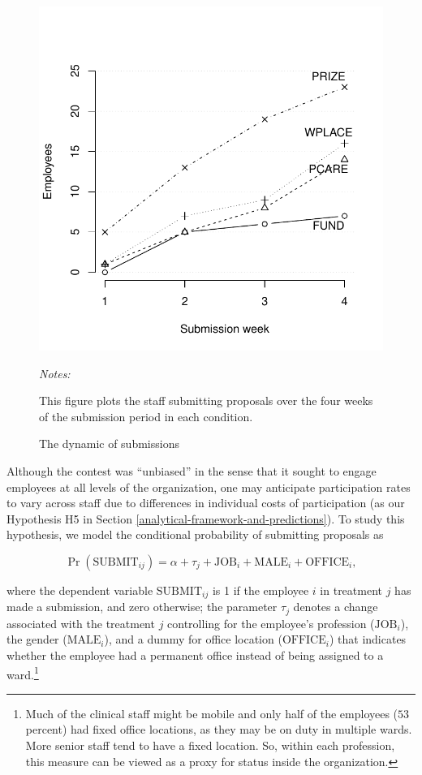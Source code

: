 \documentclass[11pt, titlepage]{article}
\newenvironment{tablenotes}[1][]{
  \begin{minipage}{\textwidth}\emph{Notes:}{\footnotesize #1}
}{\end{minipage}}
\begin{document}
\begin{figure} 
  \centering
  \caption{The dynamic of submissions}
  \label{fig: dynamic}
  \includegraphics{Figures/dynamic-1.pdf}
  \begin{tablenotes}
  This figure plots the staff submitting proposals over the four weeks of the submission period in each condition. 
  \end{tablenotes}
\end{figure}

Although the contest was ``unbiased'' in the sense that it sought to
engage employees at all levels of the organization, one may anticipate
participation rates to vary across staff due to differences in
individual costs of participation (as our Hypothesis H5 in Section
\ref{analytical-framework-and-predictions}). To study this hypothesis,
we model the conditional probability of submitting proposals as

\begin{equation} 
  \label{eq: submit}
  \Pr(\text{SUBMIT}_{ij}) 
  = \alpha + \tau_{j} + \text{JOB}_{i} + \text{MALE}_{i} + \text{OFFICE}_{i}, 
\end{equation}

where the dependent variable \(\text{SUBMIT}_{ij}\) is 1 if the employee
\(i\) in treatment \(j\) has made a submission, and zero otherwise; the
parameter \(\tau_{j}\) denotes a change associated with the treatment
\(j\) controlling for the employee's profession (\(\text{JOB}_i\)), the
gender (\(\text{MALE}_i\)), and a dummy for office location
(\(\text{OFFICE}_i\)) that indicates whether the employee had a
permanent office instead of being assigned to a ward.\footnote{Much of
  the clinical staff might be mobile and only half of the employees
  (\(53\) percent) had fixed office locations, as they may be on duty in
  multiple wards. More senior staff tend to have a fixed location. So,
  within each profession, this measure can be viewed as a proxy for
  status inside the organization.}
\end{document}
